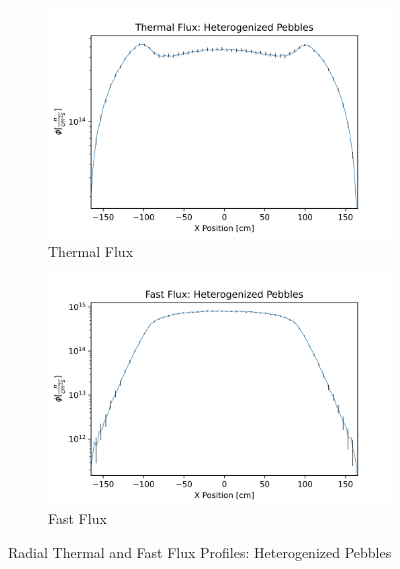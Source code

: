 \begin{figure}
\centering

\begin{subfigure}{0.45\textwidth}
  \includegraphics[width=0.95\linewidth]{figures/therm_flux_het.png}
  \caption{Thermal Flux}
  \label{fig:het-det-xy-therm}
\end{subfigure}%
%
\begin{subfigure}{0.45\textwidth}
  \includegraphics[width=0.95\linewidth]{figures/fast_flux_het.png}
  \caption{Fast Flux}
  \label{fig:het-det-xy-fast}
\end{subfigure}

%
\caption{Radial Thermal and Fast Flux Profiles: Heterogenized Pebbles}
\label{fig:het-det-xy}
\end{figure}